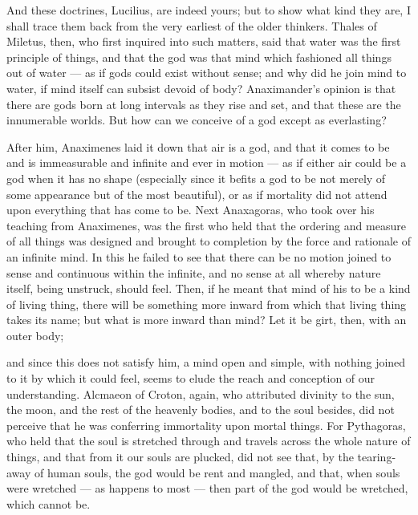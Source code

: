  And these doctrines, Lucilius, are indeed yours; but to show what kind they are, I shall trace them back from the very earliest of the older thinkers. Thales of Miletus, then, who first inquired into such matters, said that water was the first principle of things, and that the god was that mind which fashioned all things out of water — as if gods could exist without sense; and why did he join mind to water, if mind itself can subsist devoid of body? Anaximander's opinion is that there are gods born at long intervals as they rise and set, and that these are the innumerable worlds. But how can we conceive of a god except as everlasting?

 After him, Anaximenes laid it down that air is a god, and that it comes to be and is immeasurable and infinite and ever in motion — as if either air could be a god when it has no shape (especially since it befits a god to be not merely of some appearance but of the most beautiful), or as if mortality did not attend upon everything that has come to be. Next Anaxagoras, who took over his teaching from Anaximenes, was the first who held that the ordering and measure of all things was designed and brought to completion by the force and rationale of an infinite mind. In this he failed to see that there can be no motion joined to sense and continuous within the infinite, and no sense at all whereby nature itself, being unstruck, should feel. Then, if he meant that mind of his to be a kind of living thing, there will be something more inward from which that living thing takes its name; but what is more inward than mind? Let it be girt, then, with an outer body;

 and since this does not satisfy him, a mind open and simple, with nothing joined to it by which it could feel, seems to elude the reach and conception of our understanding. Alcmaeon of Croton, again, who attributed divinity to the sun, the moon, and the rest of the heavenly bodies, and to the soul besides, did not perceive that he was conferring immortality upon mortal things. For Pythagoras, who held that the soul is stretched through and travels across the whole nature of things, and that from it our souls are plucked, did not see that, by the tearing-away of human souls, the god would be rent and mangled, and that, when souls were wretched — as happens to most — then part of the god would be wretched, which cannot be.

